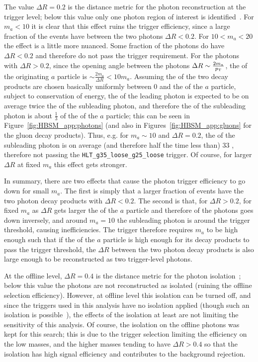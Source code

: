 The value $\Delta R=0.2$ is the distance metric for the photon reconstruction at the trigger level; below this value only one photon region of interest is identified~\cite{Achenbach:2008zzb,Aad:2019wsl}.
For $m_a<10$ \GeV{} it is clear that this effect ruins the trigger efficiency, since a large fraction of the events have between the two photons $\Delta R<0.2$.
For $10<m_a<20$ \GeV{} the effect is a little more nuanced.
Some fraction of the photons do have $\Delta R < 0.2$ and therefore do not pass the trigger requirement.
For the photons with $\Delta R > 0.2$, since the opening angle between the photons $\Delta R \sim \frac{2m_a}{p_{\text{T}}}$, the \pt{} of the originating $a$ particle is $\sim \frac{2m_a}{\Delta R} < 10 m_a$.
Assuming the \pt{} of the two decay products are chosen basically uniformly between $0$ and the \pt{} of the $a$ particle, subject to conservation of energy, the \pt{} of the leading photon is expected to be on average twice the \pt{} of the subleading photon, and therefore the \pt{} of the subleading photon is about $\frac{1}{3}$ of the \pt{} of the $a$ particle; this can be seen in Figure~\ref{fig:HBSM_app:photons} (and also in Figures~\ref{fig:HBSM_app:gluons} for the gluon decay products).
Thus, e.g. for $m_a \sim 10$ \GeV{} and $\Delta R = 0.2$, the \pt{} of the subleading photon is on average (and therefore half the time less than) $33$ \GeV{}, therefore not passing the \texttt{HLT\_g35\_loose\_g25\_loose} trigger.
Of course, for larger $\Delta R$ at fixed $m_a$ this effect gets stronger.

In summary, there are two effects that cause the photon trigger efficiency to go down for small $m_a$.
The first is simply that a larger fraction of events have the two photon decay products with $\Delta R<0.2$.
The second is that, for $\Delta R>0.2$, for fixed $m_a$ as $\Delta R$ gets larger the \pt{} of the $a$ particle and therefore of the photons goes down inversely, and around $m_a=10$ \GeV{} the subleading photon is around the trigger threshold, causing inefficiencies.
The trigger therefore requires $m_a$ to be high enough such that if the \pt{} of the $a$ particle is high enough for its decay products to pass the trigger threshold, the $\Delta R$ between the two photon decay products is also large enough to be reconstructed as two trigger-level photons.

At the offline level, $\Delta R=0.4$ is the distance metric for the photon isolation~\cite{PERF-2013-04}; below this value the photons are not reconstructed as isolated (ruining the offline selection efficiency).
However, at offline level this isolation can be turned off, and since the triggers used in this analysis have no isolation applied (though such an isolation is possible~\cite{Aad:2019wsl}), the effects of the isolation at least are not limiting the sensitivity of this analysis.
Of course, the isolation on the offline photons was kept for this search; this is due to the trigger selection limiting the efficiency on the low masses, and the higher masses tending to have $\Delta R>0.4$ so that the isolation has high signal efficiency and contributes to the background rejection.

